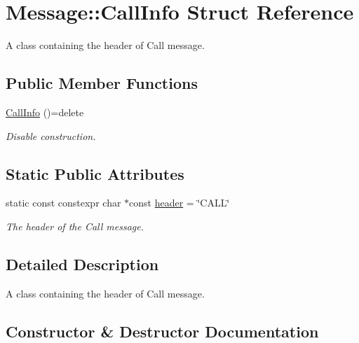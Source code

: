 \hypertarget{struct_message_1_1_call_info}{}\section{Message\+:\+:Call\+Info Struct Reference}
\label{struct_message_1_1_call_info}


A class containing the header of Call message.  


\subsection*{Public Member Functions}
\begin{DoxyCompactItemize}
\item 
\hyperlink{struct_message_1_1_call_info_a3cfe6e032837318d03aec1db2556b448}{Call\+Info} ()=delete
\begin{DoxyCompactList}\small\item\em Disable construction. \end{DoxyCompactList}\end{DoxyCompactItemize}
\subsection*{Static Public Attributes}
\begin{DoxyCompactItemize}
\item 
static const constexpr char $\ast$const \hyperlink{struct_message_1_1_call_info_a8abd3d3a05a677da712bef3ad8bd99dd}{header} = \char`\"{}C\+A\+LL\char`\"{}
\begin{DoxyCompactList}\small\item\em The header of the Call message. \end{DoxyCompactList}\end{DoxyCompactItemize}


\subsection{Detailed Description}
A class containing the header of Call message. 

\subsection{Constructor \& Destructor Documentation}
